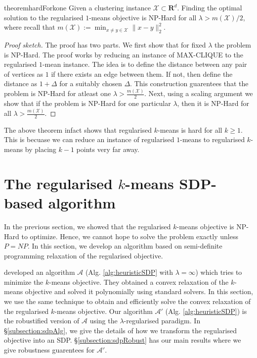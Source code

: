 \documentclass[12pt]{article}
\newcommand{\mc}{\mathcal}
\newcommand{\mb}{\mathbf}
\begin{document}
\begin{restatable}{theorem}{hardForkone}
\label{theorem:hardFork1}
Given a clustering instance $\mc X \subset \mb R^d$. Finding the optimal solution to the regularised $1$-means objective is NP-Hard for all $\lambda > m(\mc X)/2$, where recall that $m(\mc X) := \min_{x\ne y \in \mc X} \|x-y\|_2^2$.
\end{restatable}

\begin{proof}[Proof sketch]
The proof has two parts. We first show that for fixed $\lambda$ the problem is NP-Hard. The proof works by reducing an instance of MAX-CLIQUE to the regularised $1$-mean instance. The idea is to define the distance between any pair of vertices as $1$ if there exists an edge between them. If not, then define the distance as $1 + \Delta$ for a suitably chosen $\Delta$. This construction guarentees that the problem is NP-Hard for atleast one $\lambda > \frac{m(\mc X)}{2}$. Next, using a scaling argument we show that if the problem is NP-Hard for one particular $\lambda$, then it is NP-Hard for all $\lambda > \frac{m(\mc X)}{2}$.
\end{proof}

The above theorem infact shows that regularised $k$-means is hard for all $k \ge 1$. This is becuase we can reduce an instance of regularised $1$-means to regularised $k$-means by placing $k-1$ points very far away. 

\section{The regularised $k$-means SDP-based algorithm}
\label{section:heuristic}
In the previous section, we showed that the regularised $k$-means objective is NP-Hard to optimize. Hence, we cannot hope to solve the problem exactly unless $P=NP$. In this section, we develop an algorithm based on semi-definite programming relaxation of the regularised objective. 

\cite{peng2007approximating} developed an algorithm $\mc A$ (Alg. \ref{alg:heuristicSDP} with $\lambda = \infty$) which tries to minimize the $k$-means objective. They obtained a convex relaxation of the $k$-means objective and solved it polynomially using standard solvers. In this section, we use the same technique to obtain and efficiently solve the convex relaxation of the regularised $k$-means objective. Our algorithm $\mc A'$ (Alg. \ref{alg:heuristicSDP}) is the robustified version of $\mc A$ using the $\lambda$-regularised paradigm. In \S \ref{subsection:sdpAlg}, we give the details of how we transform the regularised objective into an SDP. \S \ref{subsection:sdpRobust} has our main results where we give robustness guarentees for $\mc A'$.    
\end{document}
